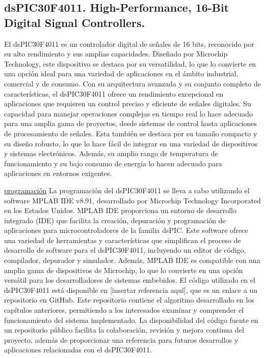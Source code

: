 \subsection{dsPIC30F4011. High-Performance, 16-Bit Digital Signal Controllers.}
El dsPIC30F4011 es un controlador digital de señales de 16 bits, reconocido por su alto rendimiento y sus amplias capacidades. Diseñado por Microchip Technology, este dispositivo se destaca por su versatilidad, lo que lo convierte en una opción ideal para una variedad de aplicaciones en el ámbito industrial, comercial y de consumo.
Con su arquitectura avanzada y su conjunto completo de características, el dsPIC30F4011 ofrece un rendimiento excepcional en aplicaciones que requieren un control preciso y eficiente de señales digitales. Su capacidad para manejar operaciones complejas en tiempo real lo hace adecuado para una amplia gama de proyectos, desde sistemas de control hasta aplicaciones de procesamiento de señales. Esta también se destaca por su tamaño compacto y su diseño robusto, lo que lo hace fácil de integrar en una variedad de dispositivos y sistemas electrónicos. Además, su amplio rango de temperatura de funcionamiento y su bajo consumo de energía lo hacen adecuado para aplicaciones en entornos exigentes.

\underline{programación}
La programación del dsPIC30F4011 se lleva a cabo utilizando el software MPLAB IDE v8.91, desarrollado por Microchip Technology Incorporated en los Estados Unidos. MPLAB IDE proporciona un entorno de desarrollo integrado (IDE) que facilita la creación, depuración y programación de aplicaciones para microcontroladores de la familia dsPIC.
Este software ofrece una variedad de herramientas y características que simplifican el proceso de desarrollo de software para el dsPIC30F4011, incluyendo un editor de código, compilador, depurador y simulador. Además, MPLAB IDE es compatible con una amplia gama de dispositivos de Microchip, lo que lo convierte en una opción versátil para los desarrolladores de sistemas embebidos.
El código utilizado en el dsPIC30F4011 está disponible en [insertar referencia aquí], que es un enlace a un repositorio en GitHub. Este repositorio contiene el algoritmo desarrollado en los capítulos anteriores, permitiendo a los interesados examinar y comprender el funcionamiento del sistema implementado. La disponibilidad del código fuente en un repositorio público facilita la colaboración, revisión y mejora continua del proyecto, además de proporcionar una referencia para futuros desarrollos y aplicaciones relacionadas con el dsPIC30F4011.

